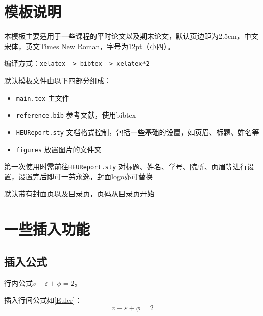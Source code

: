 \documentclass[12pt,hyperref,a4paper,UTF8]{ctexart}
\begin{document}
\cover

%
%

\thispagestyle{empty} %


\newpage


\section{模板说明}
本模板主要适用于一些课程的平时论文以及期末论文，默认页边距为2.5cm，中文宋体，英文Times New Roman，字号为12pt（小四）。

编译方式：\verb|xelatex -> bibtex -> xelatex*2|


默认模板文件由以下四部分组成：
\begin{itemize}
    \item \texttt{main.tex} 主文件
    \item \texttt{reference.bib} 参考文献，使用bibtex
    \item \texttt{HEUReport.sty} 文档格式控制，包括一些基础的设置，如页眉、标题、姓名等
    \item \texttt{figures} 放置图片的文件夹
\end{itemize}

第一次使用时需前往\texttt{HEUReport.sty} 对标题、姓名、学号、院所、页眉等进行设置，设置完后即可一劳永逸，封面logo亦可替换

默认带有封面页以及目录页，页码从目录页开始

\section{一些插入功能}
\subsection{插入公式}
行内公式$v-\varepsilon+\phi=2$。

插入行间公式如\autoref{Euler}：
\begin{equation}
    v-\varepsilon+\phi=2
    \label{Euler}
\end{equation}
\end{document}
